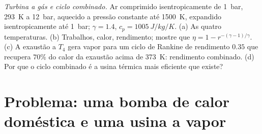 \begin{exercise}[$\star\star\star$]\label{exo:b2:open-systems:12}
\emph{Turbina a gás e ciclo combinado.} Ar comprimido isentropicamente
de \qty{1}{bar}, \qty{293}{K} a \qty{12}{bar}, aquecido a pressão constante
até \qty{1500}{K}, expandido isentropicamente até \qty{1}{bar}; $\gamma = 1.4$,
$c_p = \qty{1005}{J/kg/K}$. (a) As quatro temperaturas. (b) Trabalhos,
calor, rendimento; mostre que $\eta = 1 - r^{-(\gamma - 1)/\gamma}$. (c) A
exaustão a $T_4$ gera vapor para um ciclo de Rankine de rendimento $0.35$
que recupera $70\%$ do calor da exaustão acima de \qty{373}{K}: rendimento
combinado. (d) Por que o ciclo combinado é a usina térmica mais eficiente
que existe?
\end{exercise}

\section{Problema: uma bomba de calor doméstica e uma usina a vapor}

